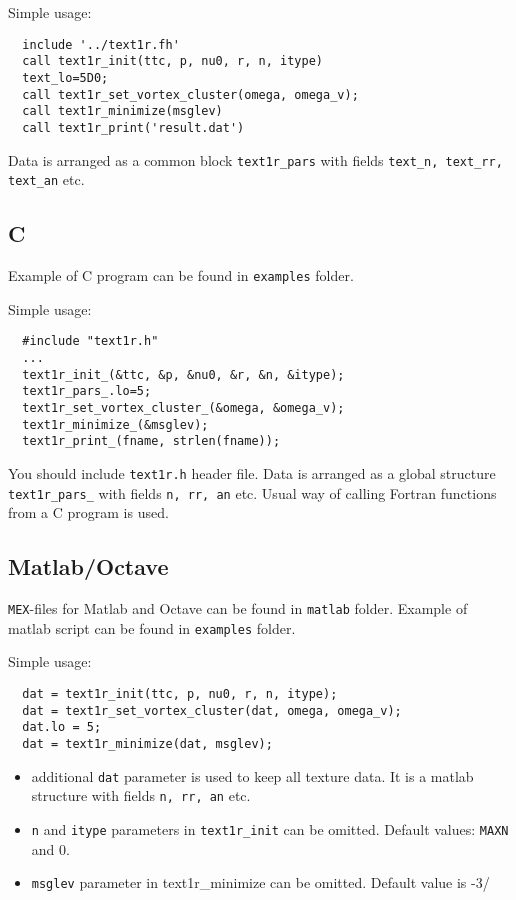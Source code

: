 \documentclass[a4paper]{article}
\begin{document}
Simple usage:
\begin{verbatim}
  include '../text1r.fh'
  call text1r_init(ttc, p, nu0, r, n, itype)
  text_lo=5D0;
  call text1r_set_vortex_cluster(omega, omega_v);
  call text1r_minimize(msglev)
  call text1r_print('result.dat')
\end{verbatim}

Data is arranged as a common block {\tt text1r\_pars} with
fields {\tt text\_n, text\_rr, text\_an} etc.

\subsection*{C}
Example of C program can be found in {\tt examples} folder.

Simple usage:
\begin{verbatim}
  #include "text1r.h"
  ...
  text1r_init_(&ttc, &p, &nu0, &r, &n, &itype);
  text1r_pars_.lo=5;
  text1r_set_vortex_cluster_(&omega, &omega_v);
  text1r_minimize_(&msglev);
  text1r_print_(fname, strlen(fname));
\end{verbatim}

You should include {\tt text1r.h} header file. Data is arranged as a
global structure {\tt text1r\_pars\_} with fields {\tt n, rr, an} etc. Usual
way of calling Fortran functions from a C program is used.

\subsection*{Matlab/Octave}
{\tt MEX}-files for Matlab and Octave can be found in {\tt matlab} folder.
Example of matlab script can be found in {\tt examples} folder.

Simple usage:
\begin{verbatim}
  dat = text1r_init(ttc, p, nu0, r, n, itype);
  dat = text1r_set_vortex_cluster(dat, omega, omega_v);
  dat.lo = 5;
  dat = text1r_minimize(dat, msglev);
\end{verbatim}

\begin{itemize}
\item additional {\tt dat} parameter is used to keep all texture data. It
is a matlab structure with fields {\tt n, rr, an} etc.

\item {\tt n} and {\tt itype} parameters in {\tt text1r\_init} can be omitted.
Default values: {\tt MAXN} and 0.

\item {\tt msglev} parameter in {text1r\_minimize} can be omitted.
Default value is -3/

\end{itemize}
\end{document}
